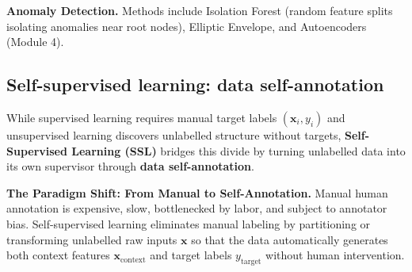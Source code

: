 \documentclass[11pt,a4paper]{article}
\begin{document}
	\textbf{Anomaly Detection.} Methods include Isolation Forest \parencite{liu2008} (random feature splits isolating anomalies near root nodes), Elliptic Envelope, and Autoencoders (Module 4).
	
	\begin{practicebox}

	\end{practicebox}

	\subsection{Self-supervised learning: data self-annotation}
	
	While supervised learning requires manual target labels $(\mathbf{x}_i, y_i)$ and unsupervised learning discovers unlabelled structure without targets, \textbf{Self-Supervised Learning (SSL)} bridges this divide by turning unlabelled data into its own supervisor through \textbf{data self-annotation}.
	
	\textbf{The Paradigm Shift: From Manual to Self-Annotation.} Manual human annotation is expensive, slow, bottlenecked by labor, and subject to annotator bias. Self-supervised learning eliminates manual labeling by partitioning or transforming unlabelled raw inputs $\mathbf{x}$ so that the data automatically generates both context features $\mathbf{x}_{\text{context}}$ and target labels $y_{\text{target}}$ without human intervention.
	
\end{document}
